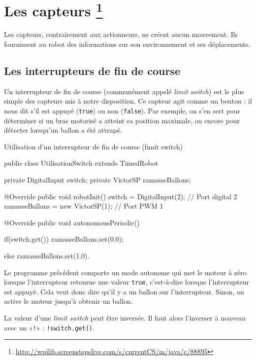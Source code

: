 \documentclass[12pt]{report}
\begin{document}
\chapter[Les capteurs]{Les capteurs \footnote{\url{http://wpilib.screenstepslive.com/s/currentCS/m/java/c/88895}}}

Les capteurs, contrairement aux actionneurs, ne créent aucun mouvement. Ils fournissent au robot des informations sur son environnement et ses déplacements.


\section{Les interrupteurs de fin de course}

Un interrupteur de fin de course (communément appelé \textit{limit switch}) est le plus simple des capteurs mis à notre disposition. Ce capteur agit comme un bouton : il nous dit s'il est appuyé (\texttt{true}) ou non (\texttt{false}). Par exemple, on s'en sert pour déterminer si un bras motorisé a atteint sa position maximale, ou encore pour détecter lorsqu'un ballon a été attrapé.

\begin{MyTCB}{Utilisation d'un interrupteur de fin de course (limit switch)}

public class UtilisationSwitch extends TimedRobot {
	
	private DigitalInput switch;
	private VictorSP ramasseBallons;
	
	@Override
	public void robotInit() {
		switch = DigitalInput(2); // Port digital 2
		ramasseBallons = new VictorSP(1); // Port PWM 1
	}

	@Override
	public void autonomousPeriodic() {
	
		if(switch.get())
			ramasseBallons.set(0.0);
			
		else
			ramasseBallons.set(1.0).

	}

}	
	
\end{MyTCB}

Le programme précédent comporte un mode autonome qui met le moteur à zéro lorsque l'interrupteur retourne une valeur \texttt{true}, c'est-à-dire lorsque l'interrupteur est appuyé. Cela veut donc dire qu'il y a un ballon sur l'interrupteur. Sinon, on active le moteur jusqu'à obtenir un ballon.

La valeur d'une \textit{limit switch} peut être inversée. Il faut alors l'inverser à nouveau avec un «\texttt{!}» : \texttt{!switch.get()}.
\end{document}
